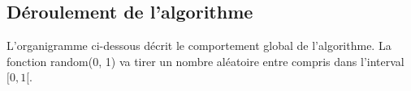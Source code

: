 \documentclass{article}
\begin{document}
\subsection{Déroulement de l'algorithme}

L'organigramme ci-dessous décrit le comportement global de l'algorithme. La fonction random(0, 1) va tirer un nombre aléatoire entre compris dans l'interval $[0, 1[$.
\newpage
\end{document}
